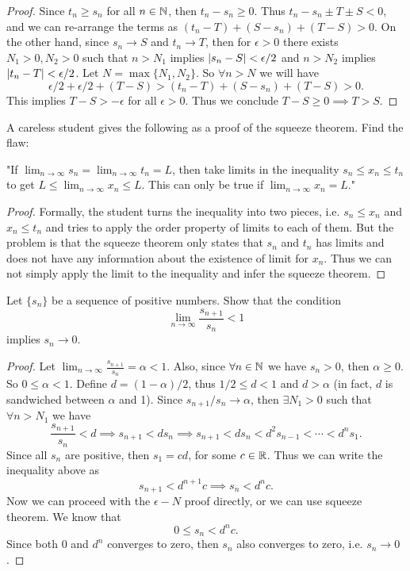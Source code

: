 \begin{proof}
	Since $t_n \geq s_n$ for all $n\in\mathbb{N}$, then $t_n - s_n \geq 0$. Thus $t_n - s_n \pm T \pm S < 0$, and we can re-arrange the terms as $(t_n - T) + (S - s_n) + (T-S) >0$. On the other hand, since $s_n \to S$ and $t_n \to T$, then for $\epsilon>0$ there exists $N_1 > 0, N_2 > 0$ such that $n>N_1$ implies $|s_n - S| < \epsilon/2$ and $n>N_2$ implies $|t_n - T| < \epsilon/2$. Let $N = \max\{N_1,N_2\}$. So $\forall n>N$ we will have
	\[ \epsilon/2 + \epsilon/2 + (T-S) > (t_n - T) + (S - s_n) + (T-S) > 0. \]
	This implies $T-S > -\epsilon$ for all $\epsilon>0$. Thus we conclude $T- S \geq 0 \implies T > S$.
\end{proof}


\begin{problem}
	A careless student gives the following as a proof of the squeeze theorem. Find the flaw:
	
	"If \(\lim_{{n \to \infty}} s_n = \lim_{{n \to \infty}} t_n = L\), then take limits in the inequality \(s_n \leq x_n \leq t_n\) to get \(L \leq \lim_{{n \to \infty}} x_n \leq L\). This can only be true if \(\lim_{{n \to \infty}} x_n = L\)."
	
\end{problem}
\begin{proof}
	Formally, the student turns the inequality into two pieces, i.e. $s_n \leq x_n$ and $x_n \leq t_n$ and tries to apply the order property of limits to each of them. But the problem is that the squeeze theorem only states that $s_n$ and $t_n$ has limits and does not have any information about the existence of limit for $x_n$. Thus we can not simply apply the limit to the inequality and infer the squeeze theorem.
\end{proof}

\begin{problem}
	Let $\{s_n\}$ be a sequence of positive numbers. Show that the condition
	\[ \lim_{n\to\infty} \frac{s_{n+1}}{s_n} < 1 \]
	implies $s_n \to 0$.
\end{problem}
\begin{proof}
	Let $\lim_{n\to\infty}\frac{s_{n+1}}{s_n} = \alpha < 1 $. Also, since $\forall n\in\mathbb{N}$ we have $s_n > 0$, then $\alpha\geq0$. So $0 \leq \alpha < 1$. Define $d = (1-\alpha)/2$, thus $1/2 \leq d < 1$ and $d > \alpha$ (in fact, $d$ is sandwiched between $\alpha$ and 1). Since $s_{n+1}/s_n \to \alpha$, then $\exists N_1 > 0$ such that $\forall n>N_1$ we have
	\[ \frac{s_{n+1}}{s_n} < d \implies s_{n+1}<d s_n \implies s_{n+1}< d s_n < d^2 s_{n-1} < \cdots < d^n s_1. \]
	Since all $s_n$ are positive, then $s_1 = c d$, for some $c \in \mathbb{R}$. Thus we can write the inequality above as
	\[ s_{n+1} < d^{n+1}c \implies s_n < d^n c. \]
	Now we can proceed with the $\epsilon-N$ proof directly, or we can use squeeze theorem. We know that 
	\[ 0 \leq s_n < d^n c. \]
	Since both $0$ and $d^n$ converges to zero, then $s_n$ also converges to zero, i.e. $s_n \to 0$.
\end{proof}

